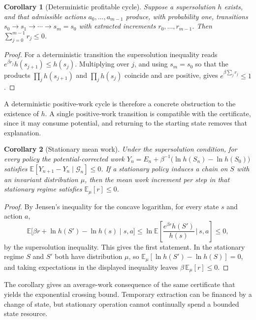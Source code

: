 \documentclass[11pt]{article}
\newtheorem{corollary}{Corollary}
\theoremstyle{definition}
\theoremstyle{remark}
\newcommand{\E}{\mathbb{E}}
\begin{document}
\begin{corollary}[Deterministic profitable cycle]\label{cor:cycle}
Suppose a supersolution $h$ exists, and that admissible actions $a_0, \dots, a_{m-1}$ produce, with probability one, transitions $s_0 \to s_1 \to \cdots \to s_m = s_0$ with extracted increments $r_0, \dots, r_{m-1}$. Then $\sum_{j=0}^{m-1} r_j \le 0$.
\end{corollary}

\begin{proof}
For a deterministic transition the supersolution inequality reads $e^{\beta r_j} h(s_{j+1}) \le h(s_j)$. Multiplying over $j$, and using $s_m = s_0$ so that the products $\prod_j h(s_{j+1})$ and $\prod_j h(s_j)$ coincide and are positive, gives $e^{\beta \sum_j r_j} \le 1$.
\end{proof}

A deterministic positive-work cycle is therefore a concrete obstruction to the existence of $h$. A single positive-work transition is compatible with the certificate, since it may consume potential, and returning to the starting state removes that explanation.

\begin{corollary}[Stationary mean work]\label{cor:stationary}
Under the supersolution condition, for every policy the potential-corrected work $Y_n = E_n + \beta^{-1}\big(\ln h(S_n) - \ln h(S_0)\big)$ satisfies $\E[Y_{n+1} - Y_n \mid \mathcal{G}_n] \le 0$. If a stationary policy induces a chain on $S$ with an invariant distribution $\mu$, then the mean work increment per step in that stationary regime satisfies $\E_\mu[r] \le 0$.
\end{corollary}

\begin{proof}
By Jensen's inequality for the concave logarithm, for every state $s$ and action $a$,
\[
\E\big[\beta r + \ln h(S') - \ln h(s) \mid s, a\big] \le \ln \E\!\left[\frac{e^{\beta r} h(S')}{h(s)} \,\Big|\, s, a\right] \le 0,
\]
by the supersolution inequality. This gives the first statement. In the stationary regime $S$ and $S'$ both have distribution $\mu$, so $\E_\mu[\ln h(S') - \ln h(S)] = 0$, and taking expectations in the displayed inequality leaves $\beta\,\E_\mu[r] \le 0$.
\end{proof}

The corollary gives an average-work consequence of the same certificate that yields the exponential crossing bound. Temporary extraction can be financed by a change of state, but stationary operation cannot continually spend a bounded state resource.
\end{document}
